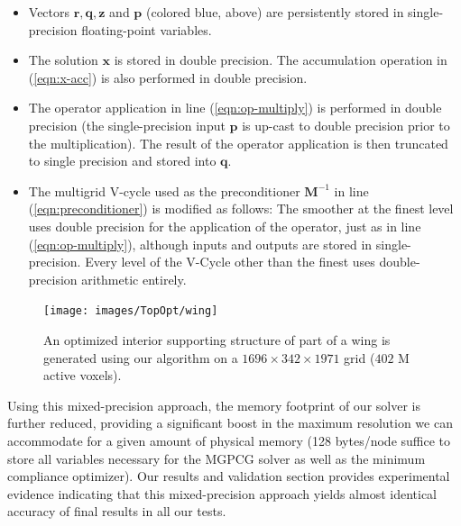 \begin{itemize}
\item Vectors $\mathbf{r},\mathbf{q},\mathbf{z}$ and $\mathbf{p}$ (colored blue, above) are persistently stored in single-precision floating-point variables. 
\item The solution $\mathbf{x}$ is stored in double precision. The accumulation operation in (\ref{eqn:x-acc}) is also performed in double precision.
\item The operator application in line (\ref{eqn:op-multiply}) is performed in double precision (the single-precision input $\mathbf{p}$ is up-cast to double precision prior to the multiplication). The result of the operator application is then truncated to single precision and stored into $\mathbf{q}$.
\item The multigrid V-cycle used as the preconditioner $\mathbf{M}^{-1}$ in line (\ref{eqn:preconditioner}) is modified as follows: The smoother at the finest level uses double precision
  for the application of the operator, just as in line (\ref{eqn:op-multiply}), although inputs and outputs are stored in single-precision. Every level of the V-Cycle other than the
  finest uses double-precision arithmetic entirely.
\end{itemize}
\begin{figure}[t!]
\texttt{[image: images/TopOpt/wing]}
\caption{An optimized interior supporting structure of part of a wing is generated using our algorithm on a $1696\times 342\times1971$ grid ($402$ M active voxels).}
\label{fig:wing}
\end{figure}
Using this mixed-precision approach, the memory footprint of our solver is further reduced, providing a significant boost in the maximum resolution we can accommodate for a given amount of physical memory (128 bytes/node suffice to store all variables necessary for the MGPCG solver as well as the minimum compliance optimizer). Our results and validation section provides experimental evidence indicating that this mixed-precision approach yields almost identical accuracy of final
results in all our tests.
